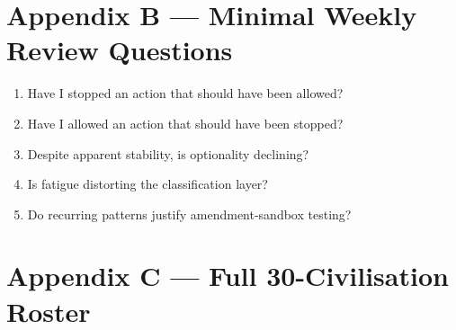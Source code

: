 \section{Appendix B --- Minimal Weekly Review Questions}
\label{sec:omega-weekly-review}

\begin{enumerate}
\item Have I stopped an action that should have been allowed?
\item Have I allowed an action that should have been stopped?
\item Despite apparent stability, is optionality declining?
\item Is fatigue distorting the classification layer?
\item Do recurring patterns justify amendment-sandbox testing?
\end{enumerate}

\section{Appendix C --- Full 30-Civilisation Roster}
\label{sec:omega-30-civ-roster}

